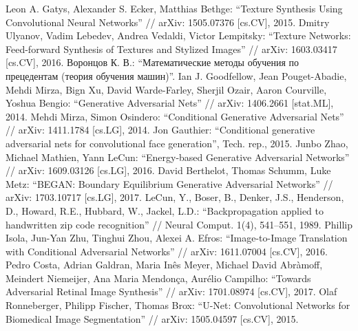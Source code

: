 \documentclass[a4paper]{article}
\begin{document}
	
	\setcounter{page}{2}
	\tableofcontents
	
	
	
	
	
	
	
	\clearpage
	\begin{thebibliography}{99}
		 Leon A. Gatys, Alexander S. Ecker, Matthias Bethge: ``Texture Synthesis Using Convolutional Neural Networks'' // arXiv: 1505.07376 [cs.CV], 2015.
		 Dmitry Ulyanov, Vadim Lebedev, Andrea Vedaldi, Victor Lempitsky: ``Texture Networks: Feed-forward Synthesis of Textures and Stylized Images'' // arXiv: 1603.03417 [cs.CV], 2016.
		  Воронцов К. В.: ``Математические методы обучения по прецедентам (теория обучения машин)''.
		 Ian J. Goodfellow, Jean Pouget-Abadie, Mehdi Mirza, Bign Xu, David Warde-Farley, Sherjil Ozair, Aaron Courville, Yoshua Bengio: ``Generative Adversarial Nets'' // arXiv: 1406.2661 [stat.ML], 2014.
		 Mehdi Mirza, Simon Osindero: ``Conditional Generative Adversarial Nets'' // arXiv: 1411.1784 [cs.LG], 2014.
		 Jon Gauthier: ``Conditional generative adversarial nets for convolutional face generation'', Tech. rep., 2015.
		 Junbo Zhao, Michael Mathien, Yann LeCun: ``Energy-based Generative Adversarial Networks'' // arXiv: 1609.03126 [cs.LG], 2016.
		 David Berthelot, Thomas Schumm, Luke Metz: ``BEGAN: Boundary Equilibrium Generative Adversarial Networks'' // arXiv: 1703.10717 [cs.LG], 2017.
		 LeCun, Y., Boser, B., Denker, J.S., Henderson, D., Howard, R.E., Hubbard, W., Jackel, L.D.: ``Backpropagation applied to handwritten zip code recognition'' // Neural Comput. 1(4), 541–551, 1989.
		 Phillip Isola, Jun-Yan Zhu, Tinghui Zhou, Alexei A. Efros: ``Image-to-Image Translation with Conditional Adversarial Networks'' // arXiv: 1611.07004 [cs.CV], 2016.
		 Pedro Costa, Adrian Galdran, Maria Inês Meyer, Michael David Abràmoff, Meindert Niemeijer, Ana Maria Mendonça, Aurélio Campilho: ``Towards Adversarial Retinal Image Synthesis'' // arXiv: 1701.08974 [cs.CV], 2017.
		 Olaf Ronneberger, Philipp Fischer, Thomas Brox: ``U-Net: Convolutional Networks for Biomedical Image Segmentation'' // arXiv: 1505.04597 [cs.CV], 2015.

\end{thebibliography}
\end{document}
